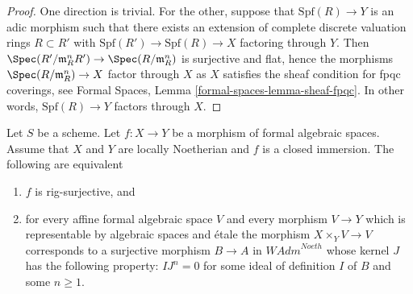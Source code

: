 \begin{proof}
One direction is trivial. For the other, suppose that $\text{Spf}(R) \to Y$
is an adic morphism such that there exists an extension of complete
discrete valuation rings $R \subset R'$ with
$\text{Spf}(R') \to \text{Spf}(R) \to X$ factoring through $Y$. Then
$\Spec(R'/\mathfrak m_R^n R') \to \Spec(R/\mathfrak m_R^n)$ is surjective
and flat, hence the morphisms $\Spec(R/\mathfrak m_R^n) \to X$ factor
through $X$ as $X$ satisfies the sheaf condition for fpqc coverings, see
Formal Spaces, Lemma \ref{formal-spaces-lemma-sheaf-fpqc}.
In other words, $\text{Spf}(R) \to Y$ factors through $X$.
\end{proof}

\begin{lemma}
\label{lemma-closed-immersion-rig-surjective}
Let $S$ be a scheme. Let $f : X \to Y$ be a morphism of formal algebraic
spaces. Assume that $X$ and $Y$ are locally Noetherian and $f$ is a
closed immersion. The following are equivalent
\begin{enumerate}
\item $f$ is rig-surjective, and
\item for every affine formal algebraic space $V$ and every morphism
$V \to Y$ which is representable by algebraic spaces and \'etale
the morphism $X \times_Y V \to V$ corresponds to a surjective morphism
$B \to A$ in $\textit{WAdm}^{Noeth}$ whose kernel $J$ has the following
property: $IJ^n = 0$ for some ideal of definition $I$ of $B$
and some $n \geq 1$.
\end{enumerate}
\end{lemma}

